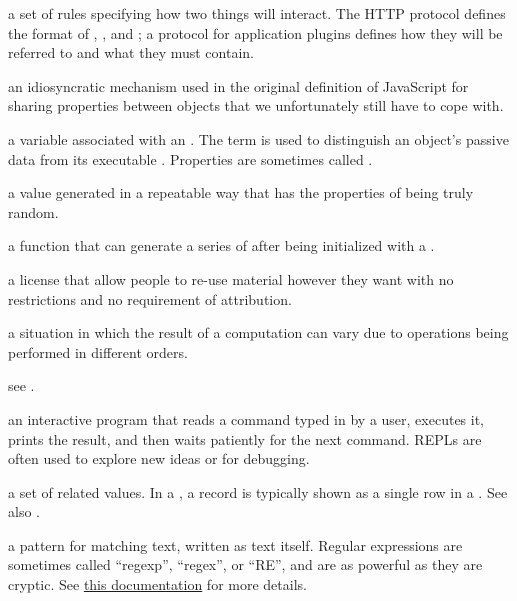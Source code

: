 \begin{description}
a set of rules specifying how two things will interact. The HTTP protocol
defines the format of ,
, and ; a
protocol for application plugins defines how they will be referred to and what
 they must contain.

an idiosyncratic mechanism used in the original definition of JavaScript for
sharing properties between objects that we unfortunately still have to cope
with.

a variable associated with an . The term is used to
distinguish an object's passive data from its executable .
Properties are sometimes called .

a value generated in a repeatable way that has the properties of being truly
random.

a function that can generate a series of  after being initialized with a
.

a license that allow people to re-use material however they want
with no restrictions and no requirement of attribution.

a situation in which the result of a computation can vary due to operations
being performed in different orders.

see .

an interactive program that reads a command typed in by a user, executes it,
prints the result, and then waits patiently for the next command. REPLs are
often used to explore new ideas or for debugging.

a set of related values. In a ,
a record is typically shown as a single row in a . See also
.

a pattern for matching text, written as text itself. Regular expressions
are sometimes called ``regexp'', ``regex'', or ``RE'', and are as powerful as
they are cryptic. See \href{https://developer.mozilla.org/en-US/docs/Web/JavaScript/Guide/Regular_Expressions}{this documentation} for more details.


\end{description}
